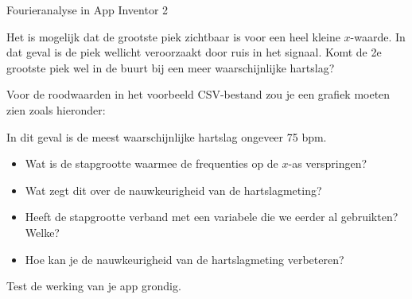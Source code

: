 \begin{opdracht}{Fourieranalyse in App Inventor 2}
	\begin{opmerking}
	Het is mogelijk dat de grootste piek zichtbaar is voor een heel kleine $x$-waarde. In dat geval is de piek wellicht veroorzaakt door ruis in het signaal. Komt de 2e grootste piek wel in de buurt bij een meer waarschijnlijke hartslag?
	\end{opmerking}

	Voor de roodwaarden in het voorbeeld CSV-bestand zou je een grafiek moeten zien zoals hieronder: 
	
	
	In dit geval is de meest waarschijnlijke hartslag ongeveer 75 bpm.
	

	\begin{itemize}
		\item Wat is de stapgrootte waarmee de frequenties op de $x$-as verspringen? 
		\item Wat zegt dit over de nauwkeurigheid van de hartslagmeting?
		\item Heeft de stapgrootte verband met een variabele die we eerder al gebruikten? Welke? 
		\item Hoe kan je de nauwkeurigheid van de hartslagmeting verbeteren?
	\end{itemize}

	Test de werking van je app grondig. 

\opdrachteindbalk

\end{opdracht}






